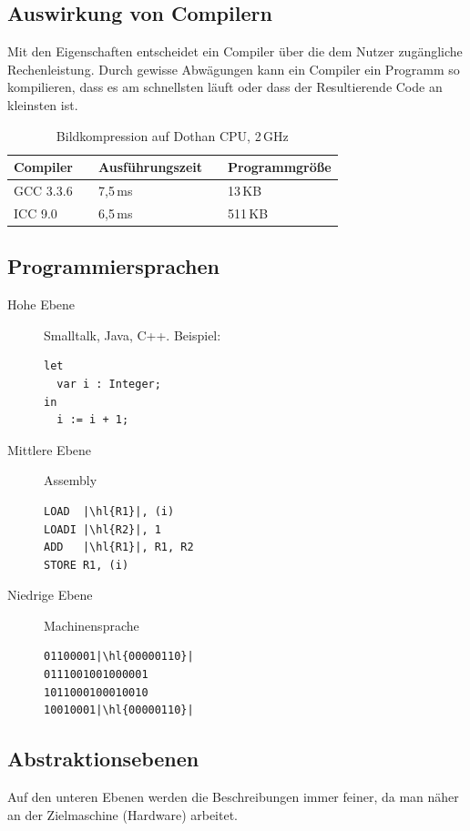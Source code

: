 \documentclass[ngerman]{scrartcl}
\newcommand{\tablespacing}[1]{\renewcommand{\arraystretch}{#1}}
\begin{document}
  \subsection{Auswirkung von Compilern}
  Mit den Eigenschaften entscheidet ein Compiler über die dem Nutzer zugängliche Rechenleistung. Durch gewisse Abwägungen kann ein Compiler ein Programm so kompilieren, dass es am schnellsten läuft oder dass der Resultierende Code an kleinsten ist.
  
  \begin{table}[h]
  \centering
  \tablespacing{1.2}
  \begin{tabular}{@{}lp{.5cm}lp{.5cm}l@{}}
    \toprule
      Compiler && Ausführungszeit && Programmgröße\\
      \midrule
        GCC 3.3.6 && 7,5\,ms && 13\,KB\\
        ICC 9.0 && 6,5\,ms && 511\,KB\\
      \bottomrule
  \end{tabular}
  \caption{Bildkompression auf Dothan CPU, 2\,GHz}
  \end{table}

  \subsection{Programmiersprachen}

\begin{description}
\item[Hohe Ebene] Smalltalk, Java, C++. Beispiel:
\begin{lstlisting}
let
  var i : Integer;
in
  i := i + 1;
\end{lstlisting}
\item[Mittlere Ebene] Assembly
\begin{lstlisting}
LOAD  |\hl{R1}|, (i)
LOADI |\hl{R2}|, 1
ADD   |\hl{R1}|, R1, R2
STORE R1, (i)
\end{lstlisting}
\item[Niedrige Ebene] Machinensprache
\begin{lstlisting}
01100001|\hl{00000110}|
0111001001000001
1011000100010010
10010001|\hl{00000110}|
\end{lstlisting}
\end{description}

\subsection{Abstraktionsebenen}

Auf den unteren Ebenen werden die Beschreibungen immer feiner, da man näher an der Zielmaschine (Hardware) arbeitet.
\end{document}
